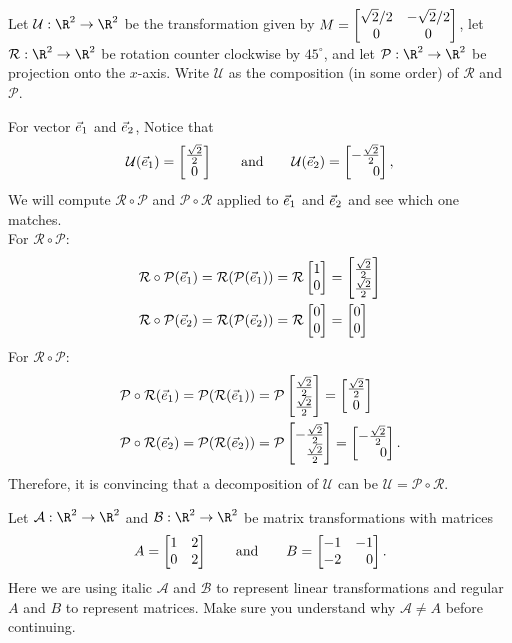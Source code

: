 \begin{example}
	Let $\mathcal U:\R^2\to\R^2$ be the transformation given by $M=\begin{bmatrix}\sqrt{2}/2&-\sqrt{2}/2\\0&0\end{bmatrix}$,
	let $\mathcal R:\R^2\to\R^2$ be rotation counter clockwise by $45^\circ$, and let $\mathcal P:\R^2\to\R^2$
	be projection onto the $x$-axis.
	Write $\mathcal U$ as the composition (in some order) of $\mathcal R$ and $\mathcal P$.

	For vector ${\vec e_1}$ and ${\vec e_2}$, Notice that
	\[
	    \mathcal U(\xhat)=\matc{\frac{\sqrt{2}}{2}\\0}\\\qquad\text{and}\qquad \mathcal U(\yhat)=\mat{-\frac{\sqrt{2}}{2}\\0},
	\]
	We will compute $\mathcal R\circ \mathcal P$ and $\mathcal P\circ\mathcal R$ applied to ${\vec e_1}$ and ${\vec e_2}$ and see which one matches. \\
	For $\mathcal R\circ \mathcal P$:
	\begin{align*}
	    \mathcal R\circ \mathcal P(\xhat)=\mathcal R(\mathcal P(\xhat))&=\mathcal R\mat{1\\0}=\mat{\frac{\sqrt{2}}{2}\\\frac{\sqrt{2}}{2}}\\
	    \mathcal R\circ \mathcal P(\yhat)=\mathcal R(\mathcal P(\yhat))&=\mathcal R\mat{0\\0}=\mat{0\\0}
	\end{align*}
	For $\mathcal R\circ \mathcal P$:
	\begin{align*}
	    \mathcal P\circ \mathcal R(\xhat)=\mathcal P(\mathcal R(\xhat))&=\mathcal P\mat{\frac{\sqrt{2}}{2}\\\frac{\sqrt{2}}{2}}=\matc{\frac{\sqrt{2}}{2}\\0}\\
	    \mathcal P\circ \mathcal R(\yhat)=\mathcal P(\mathcal R(\yhat))&=\mathcal P\mat{-\frac{\sqrt{2}}{2}\\\frac{\sqrt{2}}{2}}=\mat{-\frac{\sqrt{2}}{2}\\0}.
	\end{align*}
	Therefore, it is convincing that a decomposition of $\mathcal U$ can be $\mathcal U=\mathcal P\circ \mathcal R$.
\end{example}


Let $\mathcal A:\R^2\to\R^2$ and $\mathcal B:\R^2\to\R^2$ be matrix transformations with matrices
\[
	A=\mat{1&2\\0&2}\qquad\text{and}\qquad B=\mat{-1&-1\\-2&0}.
\]
Here we are using italic $\mathcal A$ and $\mathcal B$ to represent linear transformations and regular $A$ and $B$ to represent
matrices. Make sure you understand why $\mathcal A\neq A$ before continuing.


